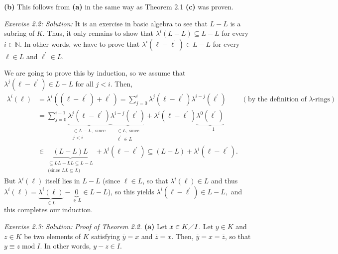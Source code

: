 \documentclass[numbers=enddot,12pt,final,onecolumn,notitlepage]{scrartcl}%
\begin{document}
\textbf{(b)} This follows from \textbf{(a)} in the same way as Theorem 2.1
\textbf{(c)} was proven.

\textit{Exercise 2.2: Solution:} It is an exercise in basic algebra to see
that $L-L$ is a subring of $K$. Thus, it only remains to show that
$\lambda^{i}\left(  L-L\right)  \subseteq L-L$ for every $i\in\mathbb{N}$. In
other words, we have to prove that $\lambda^{i}\left(  \ell-\ell^{\prime
}\right)  \in L-L$ for every $\ell\in L$ and $\ell^{\prime}\in L$.

We are going to prove this by induction, so we assume that $\lambda^{j}\left(
\ell-\ell^{\prime}\right)  \in L-L$ for all $j<i$. Then,%
\begin{align*}
\lambda^{i}\left(  \ell\right)   &  =\lambda^{i}\left(  \left(  \ell
-\ell^{\prime}\right)  +\ell^{\prime}\right)  =\sum_{j=0}^{i}\lambda
^{j}\left(  \ell-\ell^{\prime}\right)  \lambda^{i-j}\left(  \ell^{\prime
}\right)  \ \ \ \ \ \ \ \ \ \ \left(  \text{by the definition of }%
\lambda\text{-rings}\right) \\
&  =\sum_{j=0}^{i-1}\underbrace{\lambda^{j}\left(  \ell-\ell^{\prime}\right)
}_{\substack{\in L-L,\text{ since}\\j<i}}\underbrace{\lambda^{i-j}\left(
\ell^{\prime}\right)  }_{\substack{\in L\text{, since}\\\ell^{\prime}\in
L}}+\lambda^{i}\left(  \ell-\ell^{\prime}\right)  \underbrace{\lambda
^{0}\left(  \ell^{\prime}\right)  }_{=1}\\
&  \in\underbrace{\left(  L-L\right)  L}_{\substack{\subseteq LL-LL\subseteq
L-L\\\text{(since }LL\subseteq L\text{)}}}+\lambda^{i}\left(  \ell
-\ell^{\prime}\right)  \subseteq\left(  L-L\right)  +\lambda^{i}\left(
\ell-\ell^{\prime}\right)  .
\end{align*}
But $\lambda^{i}\left(  \ell\right)  $ itself lies in $L-L$ (since $\ell\in
L$, so that $\lambda^{i}\left(  \ell\right)  \in L$ and thus $\lambda
^{i}\left(  \ell\right)  =\underbrace{\lambda^{i}\left(  \ell\right)  }_{\in
L}-\underbrace{0}_{\in L}\in L-L$), so this yields $\lambda^{i}\left(
\ell-\ell^{\prime}\right)  \in L-L,$ and this completes our induction.

\textit{Exercise 2.3:} \textit{Solution:} \textit{Proof of Theorem 2.2.}
\textbf{(a)} Let $x\in K\diagup I$. Let $y\in K$ and $z\in K$ be two elements
of $K$ satisfying $\overline{y}=x$ and $\overline{z}=x$. Then, $\overline
{y}=x=\overline{z}$, so that $y\equiv z\operatorname{mod}I$. In other words,
$y-z\in I$.
\end{document}
